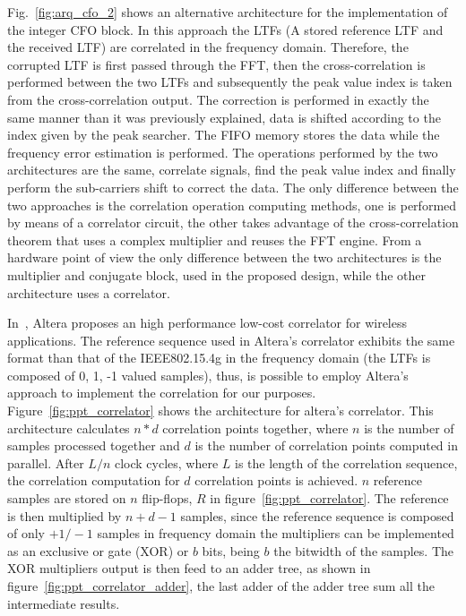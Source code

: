 Fig.~\ref{fig:arq_cfo_2} shows an alternative architecture for the implementation of the 
integer CFO block. In this approach the LTFs (A stored reference LTF and the received LTF) are correlated in the frequency domain. Therefore, the corrupted LTF is first passed through the FFT, then the cross-correlation is performed between the two LTFs and subsequently the peak value index is taken from the cross-correlation output. The correction is performed in exactly the same manner than it was previously explained, data is shifted according to the index given by the peak searcher. The FIFO memory stores the data while the frequency error estimation is performed. The operations performed by the two architectures are the same,  correlate signals, find the peak value index and finally perform the sub-carriers shift to correct the data. The only difference between the two approaches is the correlation operation computing methods,  one is performed by means of a correlator circuit, the other takes advantage of the cross-correlation theorem that uses a complex multiplier and reuses the FFT engine. From a hardware point of view the only difference between the two architectures is the multiplier and conjugate block, used in the proposed design, while the other architecture uses a correlator.  

In~\cite{altera_wp}, Altera proposes an high performance low-cost correlator for wireless applications. The reference sequence used in Altera's correlator exhibits the same format than that of the IEEE802.15.4g in the frequency domain (the LTFs is composed of 0, 1, -1 valued samples), thus, is possible to employ Altera's approach to implement the correlation for our purposes. Figure~\ref{fig:ppt_correlator} shows the architecture for altera's correlator. This architecture calculates $n*d$ correlation points together, where $n$ is the number of samples processed together and $d$ is the number of correlation points computed in parallel. After $L/n$ clock cycles, where $L$ is the length of the correlation sequence, the correlation computation for $d$ correlation points is achieved. $n$ reference samples are stored on $n$ flip-flops, $R$ in figure~\ref{fig:ppt_correlator}. The reference is then multiplied by $n+d-1$ samples, since the reference sequence is composed of only $+1/-1$ samples in frequency domain the multipliers can be implemented as an exclusive or gate (XOR) or $b$ bits, being $b$ the bitwidth of the samples. The XOR multipliers output is then feed to an adder tree, as shown in figure~\ref{fig:ppt_correlator_adder}, the last adder of the adder tree sum all the intermediate results.    

